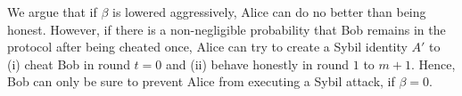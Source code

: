 \documentclass[runningheads]{llncs}
\newcommand{\sys}{Promise\xspace}
\newcommand{\dom}[1]{\todo[linecolor=green,backgroundcolor=green!25,bordercolor=green,inline,caption={}]{Comment by Dominik: #1}}
\begin{document}




We argue that if $\beta$ is lowered aggressively, Alice can do no better than being honest.
However, if there is a non-negligible probability that Bob remains in the protocol after being cheated once, Alice can try to create a Sybil identity $A'$ to (i) cheat Bob in round $t=0$ and (ii) behave honestly in round $1$ to $m+1$.
Hence, Bob can only be sure to prevent Alice from executing a Sybil attack, if $\beta = 0$.
\end{document}
